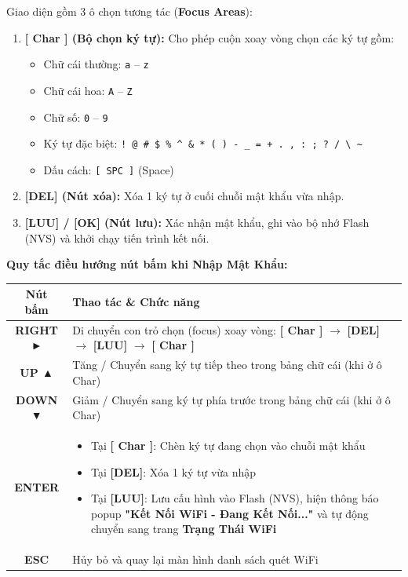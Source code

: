 \documentclass[12pt,a4paper]{article}
\begin{document}
Giao diện gồm 3 ô chọn tương tác (\textbf{Focus Areas}):
\begin{enumerate}
    \item \textbf{[ Char ] (Bộ chọn ký tự):} Cho phép cuộn xoay vòng chọn các ký tự gồm:
    \begin{itemize}[label={-}]
        \item Chữ cái thường: \texttt{a} -- \texttt{z}
        \item Chữ cái hoa: \texttt{A} -- \texttt{Z}
        \item Chữ số: \texttt{0} -- \texttt{9}
        \item Ký tự đặc biệt: \texttt{! @ \# \$ \% \textasciicircum{} \& * ( ) - \_ = + . , : ; ? / \textbackslash{} \textbar{} \textasciitilde{}}
        \item Dấu cách: \texttt{[ SPC ]} (Space)
    \end{itemize}
    \item \textbf{[DEL] (Nút xóa):} Xóa 1 ký tự ở cuối chuỗi mật khẩu vừa nhập.
    \item \textbf{[LUU] / [OK] (Nút lưu):} Xác nhận mật khẩu, ghi vào bộ nhớ Flash (NVS) và khởi chạy tiến trình kết nối.
\end{enumerate}

\textbf{Quy tắc điều hướng nút bấm khi Nhập Mật Khẩu:}
\begin{table}[H]
\centering
\begin{tabularx}{\textwidth}{|c|X|}
\hline
\textbf{Nút bấm} & \textbf{Thao tác \& Chức năng} \\ \hline
\textbf{RIGHT ►} & Di chuyển con trỏ chọn (focus) xoay vòng: \textbf{[ Char ]} $\rightarrow$ \textbf{[DEL]} $\rightarrow$ \textbf{[LUU]} $\rightarrow$ \textbf{[ Char ]} \\ \hline
\textbf{UP ▲} & Tăng / Chuyển sang ký tự tiếp theo trong bảng chữ cái (khi ở ô Char) \\ \hline
\textbf{DOWN ▼} & Giảm / Chuyển sang ký tự phía trước trong bảng chữ cái (khi ở ô Char) \\ \hline
\textbf{ENTER} & \begin{itemize}[leftmargin=*,nosep]
                    \item Tại \textbf{[ Char ]}: Chèn ký tự đang chọn vào chuỗi mật khẩu
                    \item Tại \textbf{[DEL]}: Xóa 1 ký tự vừa nhập
                    \item Tại \textbf{[LUU]}: Lưu cấu hình vào Flash (NVS), hiện thông báo popup \textbf{"Kết Nối WiFi - Đang Kết Nối..."} và tự động chuyển sang trang \textbf{Trạng Thái WiFi}
                 \end{itemize} \\ \hline
\textbf{ESC} & Hủy bỏ và quay lại màn hình danh sách quét WiFi \\ \hline
\end{tabularx}
\end{table}
\end{document}
